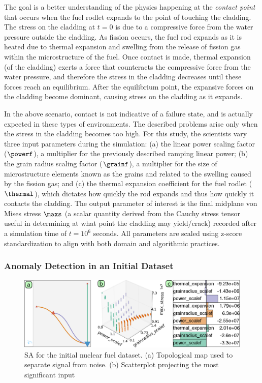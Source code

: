 The goal is a better understanding of the physics happening at the \emph{contact point} that occurs when the fuel rodlet expands to the point of touching the cladding.
%
The stress on the cladding at $t=0$ is due to a compressive force from the water pressure outside the cladding.
%
As fission occurs, the fuel rod expands as it is heated due to thermal expansion and swelling from the release of fission gas within the microstructure of the fuel.
%
Once contact is made, thermal expansion (of the cladding) exerts a force that counteracts the compressive force from the water pressure, and therefore the stress in the cladding decreases until these forces reach an equilibrium.
%
After the equilibrium point, the expansive forces on the cladding become dominant, causing stress on the cladding as it expands.

In the above scenario, contact is not indicative of a failure state, and is actually expected in these types of environments.
%
The described problems arise only when the stress in the cladding becomes too high.
%
For this study, the scientists vary three input parameters during the simulation: (a) the linear power scaling factor ($\powerf$), a multiplier for the previously described ramping linear power; (b) the grain radius scaling factor ($\grainf$), a multiplier for the size of microstructure elements known as the grains and related to the swelling caused by the fission gas; and (c) the thermal expansion coefficient for the fuel rodlet ($\thermal$), which dictates how quickly the rod expands and thus how quickly it contacts the cladding.
%
The output parameter of interest is the final midplane von Mises stress $\maxs$ (a scalar quantity derived from the Cauchy stress tensor useful in determining at what point the cladding may yield/crack) recorded after a simulation time of $t=10^6$ seconds.
%
All parameters are scaled using z-score standardization to align with both domain and algorithmic practices.

\subsubsection{Anomaly Detection in an Initial Dataset}
\label{sec:anomaly}

\begin{figure}[!h]
  \centering
  \includegraphics[width=1.0\linewidth]{figs/chap6/bisonError2}
  \caption{SA for the initial nuclear fuel dataset.
  (a) Topological map used to separate signal from noise.
  (b) Scatterplot projecting the most significant input }
  \label{fig:bisonError}
\end{figure}

